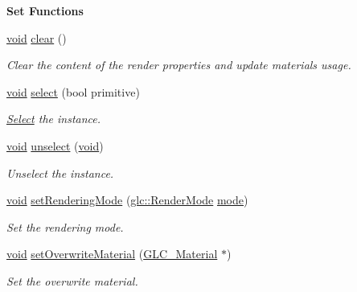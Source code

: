 \begin{Indent}{\bf Set Functions}\par
\begin{DoxyCompactItemize}
\item 
\hyperlink{group___u_a_v_objects_plugin_ga444cf2ff3f0ecbe028adce838d373f5c}{void} \hyperlink{class_g_l_c___render_properties_a7b0249199802ddd70c2eb081eb710cb6}{clear} ()
\begin{DoxyCompactList}\small\item\em Clear the content of the render properties and update materials usage. \end{DoxyCompactList}\item 
\hyperlink{group___u_a_v_objects_plugin_ga444cf2ff3f0ecbe028adce838d373f5c}{void} \hyperlink{class_g_l_c___render_properties_af572e3165a8ef5cd87c3471d73be257b}{select} (bool primitive)
\begin{DoxyCompactList}\small\item\em \hyperlink{class_select}{Select} the instance. \end{DoxyCompactList}\item 
\hyperlink{group___u_a_v_objects_plugin_ga444cf2ff3f0ecbe028adce838d373f5c}{void} \hyperlink{class_g_l_c___render_properties_a8268103b3789b29641820881e71ec426}{unselect} (\hyperlink{group___u_a_v_objects_plugin_ga444cf2ff3f0ecbe028adce838d373f5c}{void})
\begin{DoxyCompactList}\small\item\em Unselect the instance. \end{DoxyCompactList}\item 
\hyperlink{group___u_a_v_objects_plugin_ga444cf2ff3f0ecbe028adce838d373f5c}{void} \hyperlink{class_g_l_c___render_properties_a5af9f3ebd7362249e56e3c27b9555f43}{set\-Rendering\-Mode} (\hyperlink{namespaceglc_a07d65b257fe4f2b50ce733149d41c87c}{glc\-::\-Render\-Mode} \hyperlink{glext_8h_a1e71d9c196e4683cc06c4b54d53f7ef5}{mode})
\begin{DoxyCompactList}\small\item\em Set the rendering mode. \end{DoxyCompactList}\item 
\hyperlink{group___u_a_v_objects_plugin_ga444cf2ff3f0ecbe028adce838d373f5c}{void} \hyperlink{class_g_l_c___render_properties_a9226f489db47f7cd0546cfc0f3ec9d7b}{set\-Overwrite\-Material} (\hyperlink{class_g_l_c___material}{G\-L\-C\-\_\-\-Material} $\ast$)
\begin{DoxyCompactList}\small\item\em Set the overwrite material. \end{DoxyCompactList}\item 

\end{DoxyCompactItemize}
\end{Indent}

